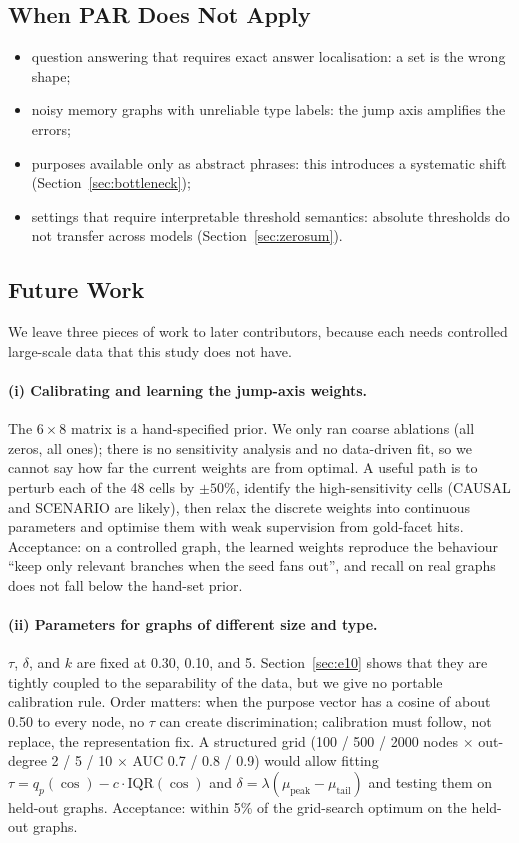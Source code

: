 \documentclass[11pt]{article}
\begin{document}
\subsection{When PAR Does Not Apply}
\label{sec:notapply}

\begin{itemize}
  \item question answering that requires exact answer localisation: a set is the wrong shape;
  \item noisy memory graphs with unreliable type labels: the jump axis amplifies the errors;
  \item purposes available only as abstract phrases: this introduces a systematic shift
        (Section~\ref{sec:bottleneck});
  \item settings that require interpretable threshold semantics: absolute thresholds do not
        transfer across models (Section~\ref{sec:zerosum}).
\end{itemize}

\subsection{Future Work}
\label{sec:future}

We leave three pieces of work to later contributors, because each needs controlled large-scale
data that this study does not have.

\paragraph{(i) Calibrating and learning the jump-axis weights.}
The $6\times8$ matrix is a hand-specified prior. We only ran coarse ablations (all zeros, all
ones); there is no sensitivity analysis and no data-driven fit, so we cannot say how far the
current weights are from optimal. A useful path is to perturb each of the 48 cells by $\pm50\%$,
identify the high-sensitivity cells (CAUSAL and SCENARIO are likely), then relax the discrete
weights into continuous parameters and optimise them with weak supervision from gold-facet hits.
Acceptance: on a controlled graph, the learned weights reproduce the behaviour ``keep only
relevant branches when the seed fans out'', and recall on real graphs does not fall below the
hand-set prior.

\paragraph{(ii) Parameters for graphs of different size and type.}
$\tau$, $\delta$, and $k$ are fixed at 0.30, 0.10, and 5. Section~\ref{sec:e10} shows that they
are tightly coupled to the separability of the data, but we give no portable calibration rule.
Order matters: when the purpose vector has a cosine of about 0.50 to every node, no $\tau$ can
create discrimination; calibration must follow, not replace, the representation fix. A
structured grid (100 / 500 / 2000 nodes $\times$ out-degree 2 / 5 / 10 $\times$ AUC 0.7 / 0.8 /
0.9) would allow fitting $\tau=q_p(\cos)-c\cdot\mathrm{IQR}(\cos)$ and
$\delta=\lambda(\mu_{\text{peak}}-\mu_{\text{tail}})$ and testing them on held-out graphs.
Acceptance: within 5\% of the grid-search optimum on the held-out graphs.
\end{document}
